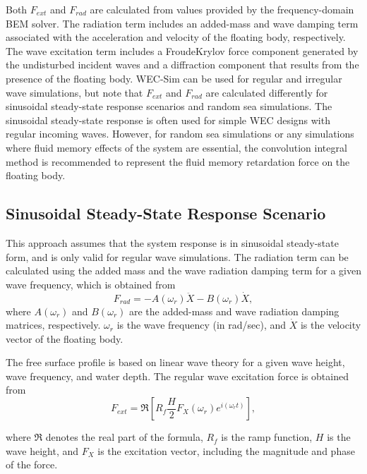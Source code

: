 \noindent Both $F_{ext}$ and $F_{rad}$ are calculated from values provided by the frequency-domain
BEM solver. The radiation term includes an added-mass and wave damping
term associated with the acceleration and velocity of the floating
body, respectively. The wave excitation term includes a Froude\textendash Krylov
force component generated by the undisturbed incident waves and a
diffraction component that results from the presence of the floating body. WEC-Sim
can be used for regular and irregular wave simulations, but note that
$F_{ext}$ and $F_{rad}$ are calculated differently for sinusoidal
steady-state response scenarios and random sea simulations. The sinusoidal
steady-state response is often used for simple WEC designs with regular
incoming waves. However, for random sea simulations or any simulations
where fluid memory effects of the system are essential, the convolution
integral method is recommended to represent the fluid memory retardation
force on the floating body. 

\subsection{\noindent Sinusoidal Steady-State Response Scenario}
\noindent This approach assumes that the system response is in sinusoidal
steady-state form, and is only valid for regular wave simulations.
The radiation term can be calculated using the added mass and the
wave radiation damping term for a given wave frequency, which is obtained
from
\begin{equation}
F_{rad}=-A(\omega_{r})\ddot{X}-B(\omega_{r})\dot{X},
\end{equation}
where $A(\omega_{r})$ and $B(\omega_{r})$ are the added-mass and
wave radiation damping matrices, respectively. $\omega_{r}$ is the wave frequency (in rad/sec),
and $\dot{X}$ is the velocity vector of the floating body. 

\noindent The free surface profile is based on linear wave theory
for a given wave height, wave frequency, and water depth. The regular
wave excitation force is obtained from
\begin{equation}
F_{ext}=\Re\left[ R_{f}\frac{H}{2}F_{X}(\omega_{r})e^{i(\omega_{r}t)} \right],\label{eq:RegularWaveExt}
\end{equation}

where $\Re$ denotes the real part of the formula, $R_{f}$ is the
ramp function, $H$ is the wave height, and $F_{X}$ is the excitation
vector, including the magnitude and phase of the force. 

